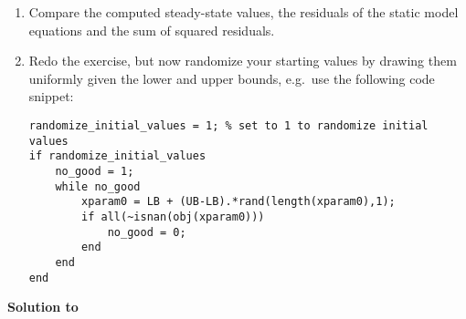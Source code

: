 \begin{enumerate}
\item Compare the computed steady-state values, the residuals of the static model equations and the sum of squared residuals.

\item Redo the exercise, but now randomize your starting values by drawing them uniformly given the lower and upper bounds,
  e.g.\ use the following code snippet:
\begin{lstlisting}[style=Matlab-editor,basicstyle=\mlttfamily\scriptsize]
randomize_initial_values = 1; % set to 1 to randomize initial values
if randomize_initial_values
    no_good = 1;
    while no_good
        xparam0 = LB + (UB-LB).*rand(length(xparam0),1);    
        if all(~isnan(obj(xparam0)))
            no_good = 0;
        end
    end
end
\end{lstlisting}
\end{enumerate}

\begin{solution}\textbf{Solution to }
\ifDisplaySolutions

\fi
\newpage
\end{solution}